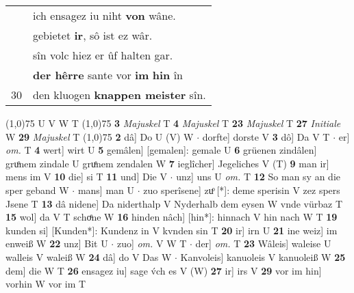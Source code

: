 \documentclass[8pt,a4paper,notitlepage]{article}
\begin{document}
\begin{table}[ht]
\begin{minipage}[t]{0.5\linewidth}
\begin{tabular}{rl}
 & ich ensagez iu niht \textbf{von} wâne.\\ 
 & gebietet \textbf{ir}, sô ist ez wâr.\\ 
 & sîn volc hiez er ûf halten gar.\\ 
 & \textbf{der hêrre} sante vor \textbf{im} \textbf{hin} în\\ 
30 & den kluogen \textbf{knappen meister} sîn.\\ 
\end{tabular}
\scriptsize
\line(1,0){75} \newline
U V W T \newline
\line(1,0){75} \newline
\textbf{3} \textit{Majuskel} T  \textbf{4} \textit{Majuskel} T  \textbf{23} \textit{Majuskel} T  \textbf{27} \textit{Initiale} W  \textbf{29} \textit{Majuskel} T  \newline
\line(1,0){75} \newline
\textbf{2} dâ] Do U (V) W  $\cdot$ dorfte] dorste V \textbf{3} dô] Da V T  $\cdot$ er] \textit{om.} T \textbf{4} wert] wirt U \textbf{5} gemâlen] [gemalen]: gemale U \textbf{6} grüenen zindâlen] gruͦnem zindale U gruͤnem zendalen W \textbf{7} ieglîcher] Jegeliches V (T) \textbf{9} man ir] mens im V \textbf{10} die] si T \textbf{11} und] Die V  $\cdot$ unz] uns U \textit{om.} T \textbf{12} So man sy an die sper geband W  $\cdot$ mans] man U  $\cdot$ zuo sperîsene] zuͦ [*]: deme sperisin V zez spers Jsene T \textbf{13} dâ nidene] Da niderthalp V Nyderhalb dem eysen W vnde vürbaz T \textbf{15} wol] da V T schoͤne W \textbf{16} hinden nâch] [hin*]: hinnach V hin nach W T \textbf{19} kunden si] [Kunden*]: Kundenz in V kvnden sin T \textbf{20} ir] irn U \textbf{21} ine weiz] im enweiß W \textbf{22} unz] Bit U  $\cdot$ zuo] \textit{om.} V W T  $\cdot$ der] \textit{om.} T \textbf{23} Wâleis] waleise U walleis V waleiß W \textbf{24} dâ] do V Das W  $\cdot$ Kanvoleis] kanuoleis V kanuoleiß W \textbf{25} dem] die W T \textbf{26} ensagez iu] sage v́ch es V (W) \textbf{27} ir] irs V \textbf{29} vor im hin] vorhin W vor im T \newline
\end{minipage}
\end{table}
\end{document}
